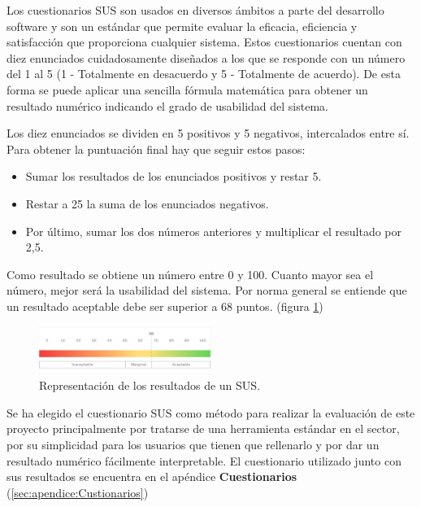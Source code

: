 Los cuestionarios SUS son usados en diversos ámbitos a parte del desarrollo software y son un estándar que permite evaluar la eficacia, eficiencia y satisfacción que proporciona cualquier sistema. Estos cuestionarios cuentan con diez enunciados cuidadosamente diseñados a los que se responde con un número del 1 al 5 (1 - Totalmente en desacuerdo y 5 - Totalmente de acuerdo). De esta forma se puede aplicar una sencilla fórmula matemática para obtener un resultado numérico indicando el grado de usabilidad del sistema. \cite{MU_eval_sus}

Los diez enunciados se dividen en 5 positivos y 5 negativos, intercalados entre sí. Para obtener la puntuación final hay que seguir estos pasos:


\begin{itemize}
	\item{Sumar los resultados de los enunciados positivos y restar 5.}
	
	\item{Restar a 25 la suma de los enunciados negativos.}
	
	\item{Por último, sumar los dos números anteriores y multiplicar el resultado por 2,5.}

\end{itemize}

Como resultado se obtiene un número entre 0 y 100. Cuanto mayor sea el número, mejor será la usabilidad del sistema. Por norma general se entiende que un resultado aceptable debe ser superior a 68 puntos. (figura \ref{fig:MU_sus})


\begin{figure}
	\centering
	\includegraphics[width=0.5\textwidth]{03.EstudioProblema/04.MetodologiaAUsar/00.Figuras/03.sus.png}
	\caption{Representación de los resultados de un SUS. \cite{MU_eval_sus}}
	\label{fig:MU_sus}
\end{figure}


Se ha elegido el cuestionario SUS como método para realizar la evaluación de este proyecto principalmente por tratarse de una herramienta estándar en el sector, por su simplicidad para los usuarios que tienen que rellenarlo y por dar un resultado numérico fácilmente interpretable. El cuestionario utilizado junto con sus resultados se encuentra en el apéndice \textbf{Cuestionarios} (\ref{sec:apendice:Custionarios}) 


















\chapterend